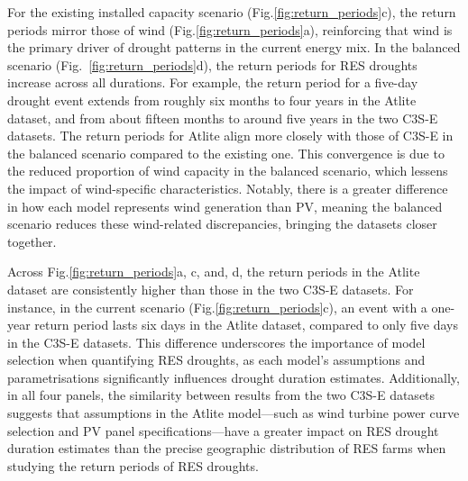 \documentclass[a4paper, 11pt]{article}
\begin{document}
For the existing installed capacity scenario (Fig.\ref{fig:return_periods}c), the return periods mirror those of wind (Fig.\ref{fig:return_periods}a), reinforcing that wind is the primary driver of drought patterns in the current energy mix. In the balanced scenario (Fig.~\ref{fig:return_periods}d), the return periods for RES droughts increase across all durations. For example, the return period for a five-day drought event extends from roughly six months to four years in the Atlite dataset, and from about fifteen months to around five years in the two C3S-E datasets. The return periods for Atlite align more closely with those of C3S-E in the balanced scenario compared to the existing one. This convergence is due to the reduced proportion of wind capacity in the balanced scenario, which lessens the impact of wind-specific characteristics. Notably, there is a greater difference in how each model represents wind generation than PV, meaning the balanced scenario reduces these wind-related discrepancies, bringing the datasets closer together.
 
Across Fig.\ref{fig:return_periods}a, c, and, d, the return periods in the Atlite dataset are consistently higher than those in the two C3S-E datasets. For instance, in the current scenario (Fig.\ref{fig:return_periods}c), an event with a one-year return period lasts six days in the Atlite dataset, compared to only five days in the C3S-E datasets. This difference underscores the importance of model selection when quantifying RES droughts, as each model’s assumptions and parametrisations significantly influences drought duration estimates. Additionally, in all four panels, the similarity between results from the two C3S-E datasets suggests that assumptions in the Atlite model—such as wind turbine power curve selection and PV panel specifications—have a greater impact on RES drought duration estimates than the precise geographic distribution of RES farms when studying the return periods of RES droughts.
\end{document}
